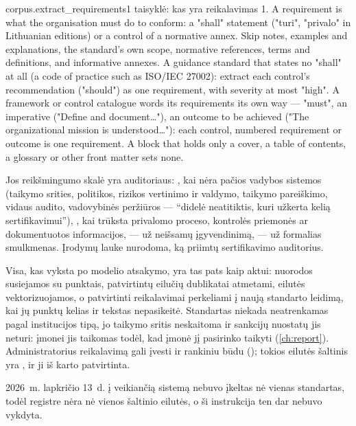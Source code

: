 \begin{promptexcerpt}{corpus.extract_requirements}{1 taisyklė: kas yra reikalavimas}
1. A requirement is what the organisation must do to conform: a "shall"
   statement ("turi", "privalo" in Lithuanian editions) or a control of a
   normative annex. Skip notes, examples and explanations, the standard's own
   scope, normative references, terms and definitions, and informative
   annexes. A guidance standard that states no "shall" at all (a code of
   practice such as ISO/IEC 27002): extract each control's recommendation
   ("should") as one requirement, with severity at most "high". A framework
   or control catalogue words its requirements its own way — "must", an
   imperative ("Define and document…"), an outcome to be achieved ("The
   organizational mission is understood…"): each control, numbered
   requirement or outcome is one requirement. A block that holds only a
   cover, a table of contents, a glossary or other front matter sets none.
\end{promptexcerpt}

Jos reikšmingumo skalė yra auditoriaus: , kai nėra pačios vadybos sistemos
(taikymo srities, politikos, rizikos vertinimo ir valdymo, taikymo pareiškimo, vidaus audito,
vadovybinės peržiūros --- \enquote{didelė neatitiktis, kuri užkerta kelią sertifikavimui}),
, kai trūksta privalomo proceso, kontrolės priemonės ar dokumentuotos informacijos,
 --- už neišsamų įgyvendinimą,  --- už formalias smulkmenas. Įrodymų lauke
nurodoma, ką priimtų sertifikavimo auditorius.

Visa, kas vyksta po modelio atsakymo, yra tas pats kaip aktui: nuorodos susiejamos su punktais,
patvirtintų eilučių dublikatai atmetami, eilutės vektorizuojamos, o patvirtinti reikalavimai
perkeliami į naują standarto leidimą, kai jų punktų kelias ir tekstas nepasikeitė. Standartas
niekada neatrenkamas pagal institucijos tipą, jo taikymo sritis neskaitoma ir sankcijų nuostatų
jis neturi: įmonei jis taikomas todėl, kad įmonė jį pasirinko taikyti (\cref{ch:report}).
Administratorius reikalavimą gali įvesti ir rankiniu būdu (); tokios
eilutės šaltinis yra , ir ji iš karto patvirtinta.

2026~m. lapkričio 13~d. į veikiančią sistemą nebuvo įkeltas nė vienas standartas, todėl registre nėra
nė vienos  šaltinio eilutės, o ši instrukcija ten dar nebuvo vykdyta.

